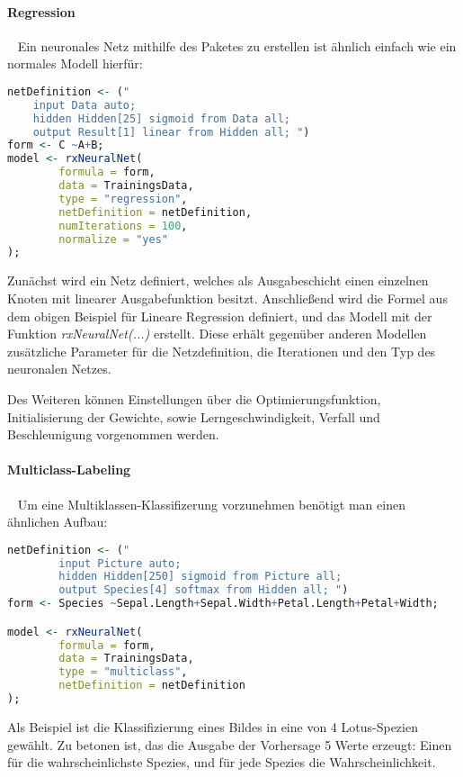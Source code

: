 \paragraph{Regression} ~\newline
Ein neuronales Netz mithilfe des Paketes zu erstellen ist ähnlich einfach wie ein normales Modell hierfür:

\begin{lstlisting}[language=R]
netDefinition <- ("
	input Data auto;
	hidden Hidden[25] sigmoid from Data all;
	output Result[1] linear from Hidden all; ")
form <- C ~A+B;
model <- rxNeuralNet(
		formula = form, 
		data = TrainingsData,              
		type = "regression",
		netDefinition = netDefinition,
		numIterations = 100,
		normalize = "yes"
);
\end{lstlisting}

Zunächst wird ein Netz definiert, welches als Ausgabeschicht einen einzelnen Knoten mit linearer Ausgabefunktion besitzt. Anschließend wird die Formel aus dem obigen Beispiel für Lineare Regression definiert, und das Modell mit der Funktion \textit{rxNeuralNet(...)} erstellt. Diese erhält gegenüber anderen Modellen zusätzliche Parameter für die Netzdefinition, die Iterationen und den Typ des neuronalen Netzes. 

Des Weiteren können Einstellungen über die Optimierungsfunktion, Initialisierung der Gewichte, sowie Lerngeschwindigkeit, Verfall und Beschleunigung vorgenommen werden.

\paragraph{Multiclass-Labeling} ~\newline
Um eine Multiklassen-Klassifizerung vorzunehmen benötigt man einen ähnlichen Aufbau:


\begin{lstlisting}[language=R]
netDefinition <- ("
		input Picture auto;
		hidden Hidden[250] sigmoid from Picture all;
		output Species[4] softmax from Hidden all; ")
form <- Species ~Sepal.Length+Sepal.Width+Petal.Length+Petal+Width;

model <- rxNeuralNet(
		formula = form, 
		data = TrainingsData,              
		type = "multiclass",
		netDefinition = netDefinition
);
\end{lstlisting}

Als Beispiel ist die Klassifizierung eines Bildes in eine von 4 Lotus-Spezien gewählt. Zu betonen ist, das die Ausgabe der Vorhersage 5 Werte erzeugt: Einen für die wahrscheinlichste Spezies, und für jede Spezies die Wahrscheinlichkeit.

